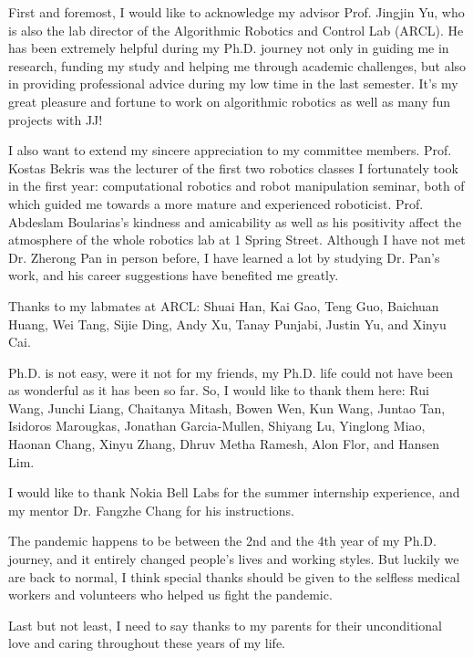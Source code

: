 
\begin{acknowledgments}
First and foremost, I would like to acknowledge my advisor Prof. Jingjin Yu, 
who is also the lab director of the Algorithmic Robotics and Control Lab (ARCL). 
He has been extremely helpful during my Ph.D. journey 
not only in guiding me in research, funding my study and helping me through academic challenges, 
but also in providing professional advice during my low time in the last semester. 
It's my great pleasure and fortune to work on algorithmic robotics 
as well as many fun projects with JJ! 

I also want to extend my sincere appreciation to my committee members. 
Prof. Kostas Bekris was the lecturer of the first two robotics classes I fortunately took in the first year: 
computational robotics and robot manipulation seminar, both of which guided me 
towards a more mature and experienced roboticist. 
Prof. Abdeslam Boularias's kindness and amicability as well as his positivity affect
the atmosphere of the whole robotics lab at 1 Spring Street.
Although I have not met Dr. Zherong Pan in person before, 
I have learned a lot by studying Dr. Pan's work, 
and his career suggestions have benefited me greatly.

Thanks to my labmates at ARCL: Shuai Han, 
Kai Gao, Teng Guo, Baichuan Huang, Wei Tang, Sijie Ding, Andy Xu, Tanay Punjabi, 
Justin Yu, and Xinyu Cai. 

Ph.D. is not easy, were it not for my friends, my Ph.D. life 
could not have been as wonderful as it has been so far. 
So, I would like to thank them here: Rui Wang, Junchi Liang, Chaitanya Mitash, Bowen Wen, Kun Wang, Juntao Tan, 
Isidoros Marougkas, Jonathan Garcia-Mullen, Shiyang Lu, Yinglong Miao, Haonan Chang, Xinyu Zhang, 
Dhruv Metha Ramesh, Alon Flor, and Hansen Lim. 

I would like to thank Nokia Bell Labs for the summer internship experience,
and my mentor Dr. Fangzhe Chang for his instructions.

The pandemic happens to be between the 2nd and the 4th year of my Ph.D. journey, 
and it entirely changed people's lives and working styles. 
But luckily we are back to normal, I think special thanks should be given to the 
selfless medical workers and volunteers who helped us fight the pandemic. 

Last but not least, I need to say thanks to my parents for their unconditional love 
and caring throughout these years of my life. 

\end{acknowledgments}

